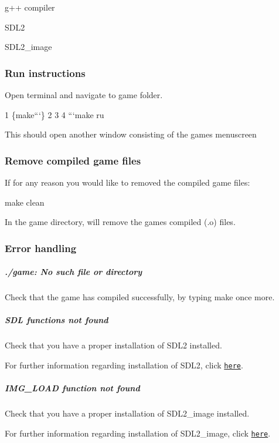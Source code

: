 
\begin{DoxyItemize}
\item g++ compiler
\item S\+D\+L2
\item S\+D\+L2\+\_\+image
\end{DoxyItemize}

\subsubsection*{Run instructions}

Open terminal and navigate to game folder.


\begin{DoxyCode}
1 \{make```\}
2 
3 
4 ```make ru
\end{DoxyCode}


This should open another window consisting of the game\textquotesingle{}s menuscreen \subsubsection*{Remove compiled game files}

If for any reason you would like to removed the compiled game files\+:

{\ttfamily make clean}

In the game directory, will remove the game\textquotesingle{}s compiled (.o) files. \subsubsection*{Error handling}

\subparagraph*{./game\+: No such file or directory}

Check that the game has compiled successfully, by typing {\ttfamily make} once more. \subparagraph*{S\+D\+L functions not found}

Check that you have a proper installation of S\+D\+L2 installed.

For further information regarding installation of S\+D\+L2, click \href{https://www.libsdl.org/download-2.0.php}{\tt here}. \subparagraph*{I\+M\+G\+\_\+\+L\+O\+A\+D function not found}

Check that you have a proper installation of S\+D\+L2\+\_\+image installed.

For further information regarding installation of S\+D\+L2\+\_\+image, click \href{https://www.libsdl.org/projects/SDL_image/}{\tt here}. 